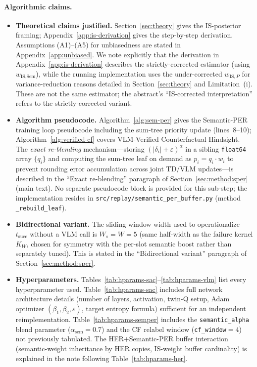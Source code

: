 \paragraph{Algorithmic claims.}
\begin{itemize}\itemsep0pt
\item \textbf{Theoretical claims justified.} Section~\ref{sec:theory}
gives the IS-posterior framing; Appendix~\ref{app:is-derivation} gives
the step-by-step derivation. Assumptions (A1)--(A5) for unbiasedness
are stated in Appendix~\ref{app:unbiased}. We note explicitly that the
derivation in Appendix~\ref{app:is-derivation} describes the
strictly-corrected estimator (using $w_{\text{IS},\text{Sem}}$), while
the running implementation uses the under-corrected $w_{\text{IS},P}$
for variance-reduction reasons detailed in
Section~\ref{sec:theory} and Limitation~(i). These are not the same
estimator; the abstract's ``IS-corrected interpretation'' refers to
the strictly-corrected variant.
\item \textbf{Algorithm pseudocode.} Algorithm~\ref{alg:sem-per} gives
the Semantic-PER training loop pseudocode including the sum-tree priority
update (lines~8--10); Algorithm~\ref{alg:verified-cf} covers VLM-Verified
Counterfactual Hindsight. The \emph{exact re-blending} mechanism---storing
$(|\delta_i|\!+\!\varepsilon)^\alpha$ in a sibling \texttt{float64} array
$\{q_i\}$ and computing the sum-tree leaf on demand as $p_i\!=\!q_i\!\cdot\!w_i$
to prevent rounding error accumulation across joint TD/VLM
updates---is described in the ``Exact re-blending'' paragraph of
Section~\ref{sec:method:sper} (main text). No separate pseudocode
block is provided for this sub-step; the implementation resides in
\texttt{src/replay/semantic\_per\_buffer.py} (method
\texttt{\_rebuild\_leaf}).
\item \textbf{Bidirectional variant.} The sliding-window width used to
operationalize $t_{\text{succ}}$ without a VLM call is $W_s\!=\!W\!=\!5$
(same half-width as the failure kernel $K_W$, chosen for symmetry with the
per-slot semantic boost rather than separately tuned). This is stated in the
``Bidirectional variant'' paragraph of Section~\ref{sec:method:sper}.
\item \textbf{Hyperparameters.} Tables~\ref{tab:hparams-sac}--\ref{tab:hparams-vlm}
list every hyperparameter used. Table~\ref{tab:hparams-sac} includes
full network architecture details (number of layers, activation,
twin-Q setup, Adam optimizer $(\beta_1,\beta_2,\varepsilon)$, target
entropy formula) sufficient for an independent reimplementation.
Table~\ref{tab:hparams-semper} includes the \texttt{semantic\_alpha}
blend parameter ($\alpha_{\text{sem}}\!=\!0.7$) and the CF relabel
window (\texttt{cf\_window}$=4$) not previously tabulated.  The
HER$+$Semantic-PER buffer interaction (semantic-weight inheritance by
HER copies, IS-weight buffer cardinality) is explained in the note
following Table~\ref{tab:hparams-her}.
\end{itemize}

